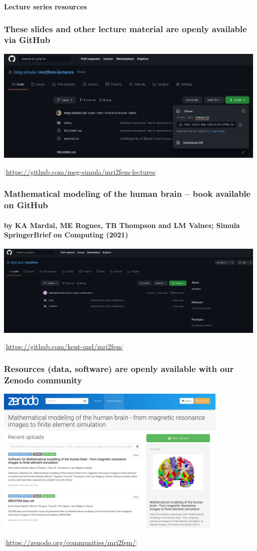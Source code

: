 \documentclass[mathserif, aspectratio=169]{beamer}
\newcommand{\refer}[1]{\begin{flushright}{\tiny \textcolor{darkgray}{[#1]}}\end{flushright}}
\newcommand{\mysection}[1]{\begin{frame} \begin{center} \vspace{3em} \textbf{#1} \end{center} \end{frame}}
\begin{document}
\mysection{Lecture series resources}

\begin{frame}
  \frametitle{These slides and other lecture material are openly available via GitHub}
  \centering
  \includegraphics[width=\textwidth]{graphics/mri2fem-lectures-github.png} \\
  \refer{\href{https://github.com/meg-simula/mri2fem-lectures}{https://github.com/meg-simula/mri2fem-lectures}}
\end{frame}

\begin{frame}
  \frametitle{Mathematical modeling of the human brain -- book available on GitHub}
  \framesubtitle{by KA Mardal, ME Rognes, TB Thompson and LM Valnes; Simula SpringerBrief on Computing (2021)}
  \centering
  \includegraphics[width=\textwidth]{graphics/mri2fem-book-github.png} \\
  \refer{\href{https://github.com/kent-and/mri2fem}{https://github.com/kent-and/mri2fem}}
\end{frame}


\begin{frame}
  \frametitle{Resources (data, software) are openly available with our Zenodo community}
  \vspace{-0.5em}
  \centering
  \includegraphics[width=0.85\textwidth]{graphics/mri2fem-zenodo.png} \\
  \vspace{-1em}
  \refer{\href{https://zenodo.org/communities/mri2fem/}{https://zenodo.org/communities/mri2fem/}}
\end{frame}
\end{document}
